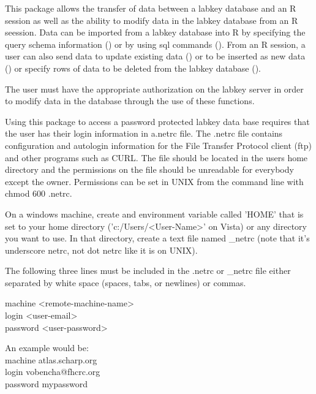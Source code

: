 \begin{Description}\relax
This package allows the transfer of data between a labkey database and an R session as well as the
ability to modify data in the labkey database from an R seession. Data can be imported from 
a labkey database into R by specifying the query schema information () 
or by using sql commands (). From an R session,
a user can also send data to update existing data () or to be inserted as new data 
() or specify rows of data to be deleted from the labkey database (). 

The user must have the appropriate authorization on the labkey
server in order to modify data in the database through the use of
these functions.
\end{Description}
\begin{Details}\relax
{}
Using this package to access a password protected labkey data base requires that the user
has their login information in a.netrc file. The .netrc file
contains configuration and autologin information for the File Transfer Protocol client (ftp) and
other programs such as CURL.
The file should be located in the users home directory and the permissions on the file should be unreadable for 
everybody except the owner. Permissions can be set in UNIX from the command line with chmod 600 .netrc.  

On a windows machine, create and  environment variable called 'HOME' that is set to your home directory ('c:/Users/<User-Name>' on Vista) or any directory you want to use. In that directory, create a text file named \_netrc (note that it's underscore netrc, not dot netrc like it is on UNIX). 

The following three lines must be included in the .netrc or \_netrc file either separated by white space
(spaces, tabs, or newlines) or commas.

machine <remote-machine-name>\\
login <user-email>\\
password <user-password>


An example would be:\\
machine atlas.scharp.org\\
login vobencha@fhcrc.org\\
password mypassword\\
\end{Details}
